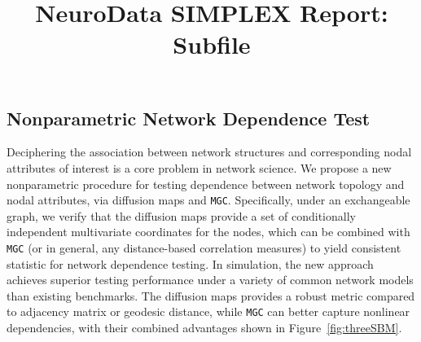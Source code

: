 \documentclass[simplex.tex]{subfiles}
\title{NeuroData SIMPLEX Report: Subfile}
\begin{document}

\subsection{Nonparametric Network Dependence Test} 

Deciphering the association between network structures and corresponding nodal attributes of interest is a core problem in network science. We propose a new nonparametric procedure for testing dependence between network topology and nodal attributes, via diffusion maps and \texttt{MGC}. Specifically, under an exchangeable graph, we verify that the diffusion maps provide a set of conditionally independent multivariate coordinates for the nodes, which can be combined with \texttt{MGC} (or in general, any distance-based correlation measures) to yield consistent statistic for network dependence testing. In simulation, the new approach achieves superior testing performance under a variety of common network models than existing benchmarks. The diffusion maps provides a robust metric compared to adjacency matrix or geodesic distance, while \texttt{MGC} can better capture nonlinear dependencies, with their combined advantages shown in Figure~\ref{fig:threeSBM}.  
\end{document}
